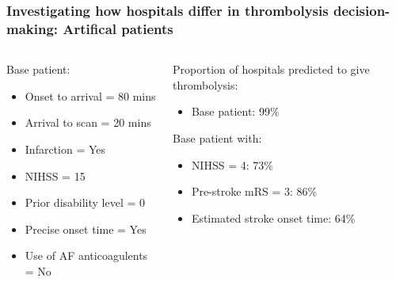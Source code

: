 \documentclass{beamer}
\begin{document}
\begin{frame}
\frametitle{Investigating how hospitals differ in thrombolysis decision-making: Artifical patients}

\vspace{3mm}

\begin{columns}[t]
    \begin{column}{0.45\textwidth}
        Base patient:
        \begin{itemize}
            \footnotesize
            \item Onset to arrival = 80 mins
            \item Arrival to scan = 20 mins
            \item Infarction = Yes
            \item NIHSS = 15
            \item Prior disability level = 0
            \item Precise onset time = Yes
            \item Use of AF anticoagulents = No
        \end{itemize}
    \end{column}
    
    \begin{column}{0.5\textwidth}
    Proportion of hospitals predicted to give thrombolysis:
    \footnotesize
    \begin{itemize}
        \item Base patient: 99\%
    \end{itemize}
    Base patient with:
    \begin{itemize}
        \item NIHSS = 4: 73\%
        \item Pre-stroke mRS = 3: 86\%
        \item Estimated stroke onset time: 64\%
    \end{itemize}
    \end{column}

\end{columns}
\end{frame}


\end{document}
